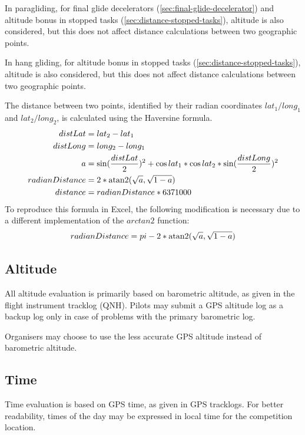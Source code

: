 \documentclass{article}
\begin{document}
\begin{pg}
In paragliding, for final glide decelerators (\ref{sec:final-glide-decelerator})
and altitude bonus in stopped tasks (\ref{sec:distance-stopped-tasks}), altitude
is also considered, but this does not affect distance calculations between two
geographic points.
\end{pg}

\begin{hg}
In hang gliding, for altitude bonus in stopped tasks (\ref{sec:distance-stopped-tasks}),
altitude is also considered, but this does not affect distance calculations between
two geographic points.
\end{hg}

The distance between two points, identified by their radian coordinates
\(lat_1/long_1\) and \(lat_2/long_2\), is calculated using the Haversine formula.
\begin{align*}
    distLat &= lat_2 - lat_1 \\
    distLong &= long_2 - long_1 \\
    a &= \sin(\frac{distLat}{2})^2 + \cos lat_1 * \cos lat_2 * \sin(\frac{distLong}{2})^2 \\
    radianDistance &= 2 * \operatorname{atan2}(\sqrt a, \sqrt{1 - a}) \\
    distance &= radianDistance * 6371000 \\
\end{align*}
To reproduce this formula in Excel, the following modification is necessary due
to a different implementation of the \(arctan2\) function:
\[ radianDistance = pi - 2 * \operatorname{atan2}(\sqrt a, \sqrt{1 - a}) \]

\subsection{Altitude}
All altitude evaluation is primarily based on barometric altitude, as given in
the flight instrument tracklog (QNH). Pilots may submit a GPS altitude log as
a backup log only in case of problems with the primary barometric log.

Organisers may choose to use the less accurate GPS altitude instead of
barometric altitude.

\subsection{Time}
Time evaluation is based on GPS time, as given in GPS tracklogs. For better
readability, times of the day may be expressed in local time for the
competition location.
\end{document}
